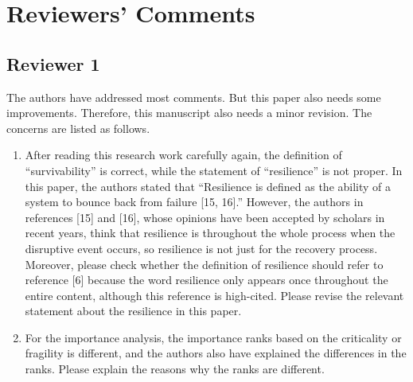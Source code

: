 \documentclass{article}
\begin{document}
\section{Reviewers' Comments}
\label{sec:reviewers}

\subsection{Reviewer 1}
\label{sec:reviewer:r1}
The authors have addressed most comments. But this paper also needs some improvements. Therefore, this manuscript also needs a minor revision. The concerns are listed as follows.

\begin{enumerate}
  \item After reading this research work carefully again, the definition of ``survivability'' is correct, while the statement of ``resilience'' is not proper. In this paper, the authors stated that ``Resilience is defined as the ability of a system to bounce back from failure [15, 16].'' However, the authors in references [15] and [16], whose opinions have been accepted by scholars in recent years, think that resilience is throughout the whole process when the disruptive event occurs, so resilience is not just for the recovery process. Moreover, please check whether the definition of resilience should refer to reference [6] because the word resilience only appears once throughout the entire content, although this reference is high-cited. Please revise the relevant statement about the resilience in this paper.
  \item For the importance analysis, the importance ranks based on the criticality or fragility is different, and the authors also have explained the differences in the ranks. Please explain the reasons why the ranks are different.
\end{enumerate}
\end{document}
